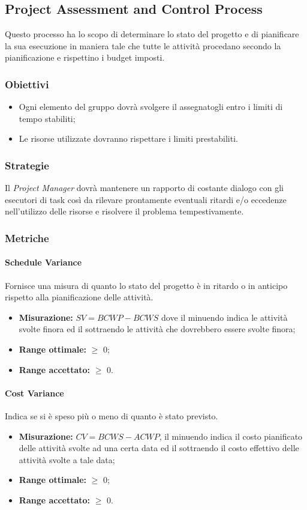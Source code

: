 	\subsection{Project Assessment and Control Process}
		Questo processo ha lo scopo di determinare lo stato del progetto e di pianificare la sua esecuzione in maniera tale che tutte le attività procedano secondo la pianificazione e rispettino i budget imposti.
		\subsubsection{Obiettivi}
			\begin{itemize}
				\item Ogni elemento del gruppo dovrà svolgere il  assegnatogli entro i limiti di tempo stabiliti;
				\item Le risorse utilizzate dovranno rispettare i limiti prestabiliti.
			\end{itemize}
	\subsubsection{Strategie}
	Il \emph{Project Manager} dovrà mantenere un rapporto di costante dialogo con gli esecutori di task così da rilevare prontamente eventuali ritardi e/o eccedenze nell'utilizzo delle risorse e risolvere il problema tempestivamente.
	\subsubsection{Metriche}
		\paragraph{Schedule Variance} \Spazio
		Fornisce una misura di quanto lo stato del progetto è in ritardo o in anticipo rispetto alla pianificazione delle attività.
		\begin{itemize}
			\item  \textbf{Misurazione: }$SV = BCWP - BCWS$ dove il minuendo indica le attività svolte finora ed il sottraendo le attività che dovrebbero essere svolte finora;
			\item \textbf{Range ottimale: }$\geq$ 0;
			\item \textbf{Range accettato: }$\geq$ 0.
		\end{itemize}
		\paragraph{Cost Variance} \Spazio
		Indica se si è speso più o meno di quanto è stato previsto.
		\begin{itemize}
			\item \textbf{Misurazione: }$CV = BCWS - ACWP$, il minuendo indica il costo pianificato delle attività svolte ad una certa data ed il sottraendo il costo effettivo delle attività svolte a tale data;
			\item \textbf{Range ottimale: }$\geq$ 0;
			\item \textbf{Range accettato: }$\geq$ 0.
		\end{itemize}

